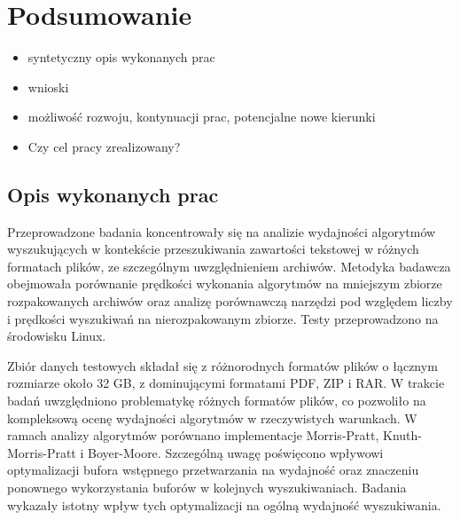 
\chapter{Podsumowanie}


\begin{itemize}
\item syntetyczny opis wykonanych prac
\item wnioski
\item możliwość rozwoju, kontynuacji prac, potencjalne nowe kierunki
\item Czy cel pracy zrealizowany? 
\end{itemize}

\section{Opis wykonanych prac}

Przeprowadzone badania koncentrowały się na analizie wydajności algorytmów 
wyszukujących w kontekście przeszukiwania zawartości tekstowej w różnych formatach 
plików, ze szczególnym uwzględnieniem archiwów. Metodyka badawcza obejmowała porównanie
prędkości wykonania algorytmów na mniejszym zbiorze rozpakowanych archiwów oraz 
analizę porównawczą narzędzi pod względem liczby i prędkości wyszukiwań na 
nierozpakowanym zbiorze. Testy przeprowadzono na środowisku Linux.
 
Zbiór danych testowych składał się z różnorodnych formatów plików o łącznym 
rozmiarze około 32 GB, z dominującymi formatami PDF, ZIP i RAR. W trakcie badań
uwzględniono problematykę różnych formatów plików, co pozwoliło na kompleksową
ocenę wydajności algorytmów w rzeczywistych warunkach. W ramach analizy
algorytmów porównano implementacje Morris-Pratt, Knuth-Morris-Pratt i Boyer-Moore.
Szczególną uwagę poświęcono wpływowi optymalizacji bufora wstępnego przetwarzania
na wydajność oraz znaczeniu ponownego wykorzystania buforów w kolejnych wyszukiwaniach.
Badania wykazały istotny wpływ tych optymalizacji na ogólną wydajność wyszukiwania.

